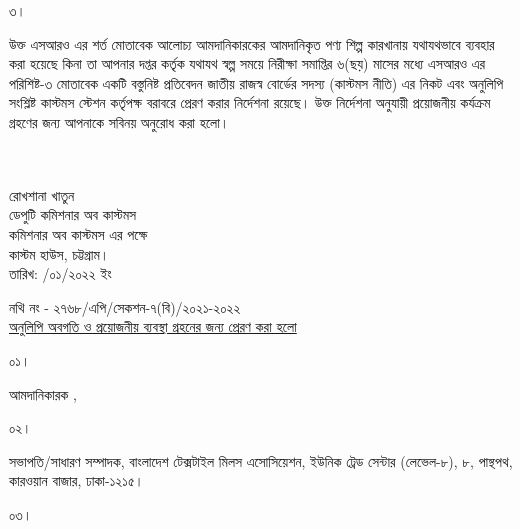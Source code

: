 \documentclass[12pt]{article}
\newcommand{\fileno}{নথি নং - ২৭৬৮/এপি/সেকশন-৭(বি)/২০২১-২০২২}
\newcommand{\impn}{\scml}
\newcommand{\impadd}{\scmla}
\newcommand{\rodt}{তারিখ: \hspace{2.0em}/০১/২০২২ ইং}
\begin{document}
\begin{minipage}[t]{.07\linewidth}
৩।
\end{minipage}
\begin{minipage}[t]{.93\linewidth}
উক্ত এসআরও এর শর্ত মোতাবেক
আলোচ্য আমদানিকারকের আমদানিকৃত পণ্য
শিল্প কারখানায় যথাযথভাবে ব্যবহার করা হয়েছে
কিনা তা আপনার দপ্তর কর্তৃক
যথাযথ স্বল্প সময়ে
নিরীক্ষা সমাপ্তির ৬(ছয়) মাসের মধ্যে এসআরও
এর পরিশিষ্ট-৩ মোতাবেক একটি বস্তুনিষ্ট
প্রতিবেদন জাতীয় রাজস্ব বোর্ডের সদস্য
(কাস্টমস নীতি) এর নিকট এবং অনুলিপি সংশ্লিষ্ট
কাস্টমস স্টেশন কর্তৃপক্ষ বরাবরে প্রেরণ করার
নির্দেশনা রয়েছে। উক্ত নির্দেশনা
অনুযায়ী প্রয়োজনীয় কর্যক্রম গ্রহণের জন্য
আপনাকে সবিনয় অনুরোধ করা হলো।
\\
\\
\\
\end{minipage}
\begin{minipage}[t]{0.60\linewidth}
\hspace{1em}
\end{minipage}
\begin{minipage}[t]{0.40\linewidth}
\begin{center}
রোখশানা খাতুন
\\
ডেপুটি কমিশনার অব কাস্টমস
\\
কমিশনার অব কাস্টমস এর পক্ষে
\\
কাস্টম হাউস, চট্টগ্রাম।
\\
\footnotesize{{\rodt}}
\vspace*{10MM}
\end{center}
\end{minipage}
\footnotesize{{\fileno}}
\\
\underline{\footnotesize{অনুলিপি অবগতি ও প্রয়োজনীয় ব্যবস্থা গ্রহনের জন্য প্রেরণ করা হলো}}
\\
\begin{minipage}[t]{0.06\linewidth}
\footnotesize{০১।}
\end{minipage}
\begin{minipage}[t]{0.94\linewidth}
\footnotesize{
আমদানিকারক {\impn}, {\impadd}
}
\end{minipage}
\begin{minipage}[t]{0.06\linewidth}
\footnotesize{০২।}
\end{minipage}
\begin{minipage}[t]{0.94\linewidth}
সভাপতি/সাধারণ সম্পাদক, বাংলাদেশ টেক্সটাইল
মিলস এসোসিয়েশন, ইউনিক ট্রেড সেন্টার (লেভেল-৮),
৮, পান্থপথ, কারওয়ান বাজার, ঢাকা-১২১৫।
\end{minipage}
\begin{minipage}[t]{0.06\linewidth}
\footnotesize{০৩।}
\end{minipage}
\end{document}
